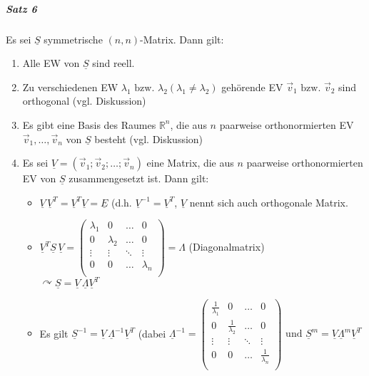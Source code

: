 \documentclass[a4paper]{scrartcl}
\begin{document}
\subparagraph{Satz 6} Es sei $\underline{S}$ symmetrische $(n,n)$-Matrix. Dann gilt:
\begin{enumerate}
\item Alle EW von $\underline{S}$ sind reell.
\item Zu verschiedenen EW $\lambda_1 \text{ bzw. } \lambda_2 (\lambda_1 \neq \lambda_2 )$ gehörende EV $\vec{v}_1 \text{ bzw. } \vec{v}_2$ sind orthogonal (vgl. Diskussion)
\item Es gibt eine Basis des Raumes $\mathbb{R}^n$, die aus $n$ paarweise orthonormierten EV $\vec{v}_1, \dots , \vec{v}_n$ von $\underline{S}$ besteht (vgl. Diskussion)
\item Es sei $\underline{V} = (\vec{v}_1; \vec{v}_2; \dots ; \vec{v}_n ) $ eine Matrix, die aus $n$ paarweise orthonormierten EV von $\underline{S}$ zusammengesetzt ist. Dann gilt:
\begin{itemize}
\item $\underline{V} \, \underline{V}^T = \underline{V}^T \underline{V} = \underline{E}$ (d.h. $\underline{V}^{-1} = \underline{V}^T$, $\underline{V}$ nennt sich auch orthogonale Matrix.
\item $\underline{V}^T \underline{S} \, \underline{V} = \begin{pmatrix}
\lambda_1 & 0 & \dots & 0\\
0 & \lambda_2 & \dots & 0\\
\vdots & \vdots & \ddots & \vdots \\
0 & 0 & \dots & \lambda_n \\
\end{pmatrix} = \Lambda$ (Diagonalmatrix)\\
$\curvearrowright \underline{S} = \underline{V} \, \underline{\Lambda} \underline{V}^T$
\item Es gilt $\underline{S}^{-1} = \underline{V} \, \underline{\Lambda}^{-1} \underline{V}^T$ (dabei $\underline{\Lambda}^{-1} = \begin{pmatrix}
\frac{1}{\lambda_1} & 0 & \dots & 0\\
0 & \frac{1}{\lambda_2} & \dots & 0\\
\vdots & \vdots & \ddots & \vdots \\
0 & 0 & \dots & \frac{1}{\lambda_n} \\
\end{pmatrix} \text{ und } \underline{S}^m = \underline{V} \underline{\Lambda}^m \underline{V}^T$
\end{itemize}

\end{enumerate}
\end{document}
